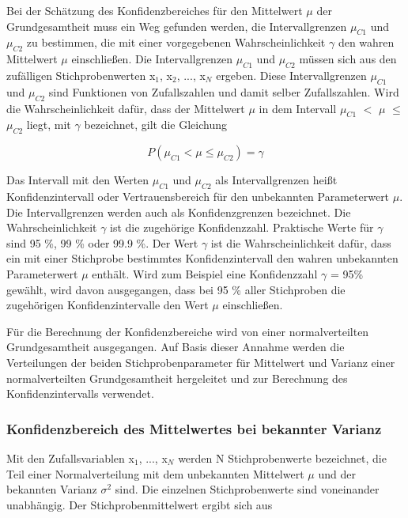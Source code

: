 \noindent Bei der Sch\"{a}tzung des Konfidenzbereiches f\"{u}r den Mittelwert $\mu$ der Grundgesamtheit muss ein Weg gefunden werden, die Intervallgrenzen $\mu_{C1}$ und $\mu_{C2}$ zu bestimmen, die mit einer vorgegebenen Wahrscheinlichkeit $\gamma$ den wahren Mittelwert $\mu$ einschlie{\ss}en. Die Intervallgrenzen $\mu_{C1}$ und $\mu_{C2}$ m\"{u}ssen sich aus den zuf\"{a}lligen Stichprobenwerten x$_{1}$, x$_{2}$, ..., x$_{N}$ ergeben. Diese Intervallgrenzen $\mu_{C1}$ und $\mu_{C2}$ sind Funktionen von Zufallszahlen und damit selber Zufallszahlen. Wird die Wahrscheinlichkeit daf\"{u}r, dass der Mittelwert $\mu$ in dem Intervall $\mu_{C1}$ $\mathrm{<}$ $\mu$ $\leq$ $\mu_{C2}$ liegt, mit $\gamma$ bezeichnet, gilt die Gleichung

\begin{equation}\label{eq:fiveeighteen}
P\left(\mu _{C1} <\mu \le \mu _{C2} \right)=\gamma
\end{equation}

\noindent Das Intervall mit den Werten $\mu_{C1}$ und $\mu_{C2}$ als Intervallgrenzen hei{\ss}t Konfidenzintervall oder Vertrauensbereich f\"{u}r den unbekannten Parameterwert $\mu$. Die Intervallgrenzen werden auch als Konfidenzgrenzen bezeichnet. Die Wahrscheinlichkeit $\gamma$ ist die zugeh\"{o}rige Konfidenzzahl. Praktische Werte f\"{u}r $\gamma$ sind 95 \%, 99 \% oder 99.9 \%. Der Wert $\gamma$ ist die Wahrscheinlichkeit daf\"{u}r, dass ein mit einer Stichprobe bestimmtes Konfidenzintervall den wahren unbekannten Parameterwert $\mu$ enth\"{a}lt. Wird zum Beispiel eine Konfidenzzahl $\gamma$ = 95\% gew\"{a}hlt, wird davon ausgegangen, dass bei 95 \% aller Stichproben die zugeh\"{o}rigen Konfidenzintervalle den Wert $\mu$ einschlie{\ss}en. \newline 

\noindent F\"{u}r die Berechnung der Konfidenzbereiche wird von einer normalverteilten Grundgesamtheit ausgegangen. Auf Basis dieser Annahme werden die Verteilungen der beiden Stichprobenparameter f\"{u}r Mittelwert und Varianz einer normalverteilten Grundgesamtheit hergeleitet und zur Berechnung des Konfidenzintervalls verwendet. 


\subsubsection{Konfidenzbereich des Mittelwertes bei bekannter Varianz}

\noindent Mit den Zufallsvariablen x$_{1}$, ..., x$_{N}$ werden N Stichprobenwerte bezeichnet, die Teil einer Normalverteilung mit dem unbekannten Mittelwert $\mu$ und der bekannten Varianz $\sigma^{2}$ sind. Die einzelnen Stichprobenwerte sind voneinander unabh\"{a}ngig. Der Stichprobenmittelwert ergibt sich aus 

